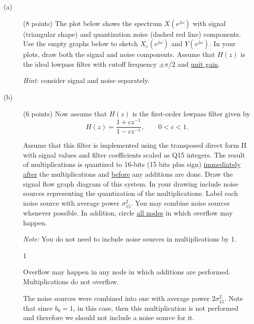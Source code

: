 \documentclass[10pt]{article}
\def\SOLUTIONS{1} %
\def\SolutionsColor{red2}
\begin{document}
\begin{description}
\item[(a)] (8 points) The plot below shows the spectrum $X(e^{j\omega})$ with signal (triangular shape) and quantization noise (dashed red line) components. Use the empty graphs below to sketch $X_e(e^{j\omega})$ and $Y(e^{j\omega})$. In your plots, draw both the signal and noise components. Assume that $H(z)$ is the ideal lowpass filter with cutoff frequency $\pm\pi/2$ and \underline{unit gain}.

\textit{Hint:} consider signal and noise separately.
 
\FloatBarrier
\begin{figure}[!h]
\centering
	\resizebox{0.9\textwidth}{!}{} \label{fig:spectrum_upsample}
\end{figure}
\FloatBarrier

\item[(b)] (6 points) Now assume that $H(z)$ is the first-order lowpass filter given by
\begin{equation}
H(z) = \frac{1 + cz^{-1}}{1 - cz^{-1}}, \qquad 0 < c < 1.
\end{equation}

Assume that this filter is implemented using the transposed direct form II with signal values and filter coefficients scaled as Q15 integers. The result of multiplications is quantized to 16-bits (15 bits plus sign) \underline{immediately after} the multiplications and \underline{before} any additions are done. Draw the signal flow graph diagram of this system. In your drawing include noise sources representing the quantization of the multiplications. Label each noise source with average power $\sigma_{15}^2$. You may combine noise sources whenever possible. In addition, circle \underline{all nodes} in which overflow may happen.

\textit{Note:} You do not need to include noise sources in multiplications by 1.

\if\SOLUTIONS1
{\color{\SolutionsColor}
Overflow may happen in any node in which additions are performed. Multiplications do not overflow. 

The noise sources were combined into one with average power $2\sigma_{15}^2$. Note that since $b_0 = 1$, in this case, then this multiplication is not performed and therefore we should not include a noise source for it.

\FloatBarrier
\begin{figure}[h!]
\centering
	\def\SolD{1}
	\resizebox{0.5\textwidth}{!}{}
\end{figure}
\FloatBarrier
}
\else\vspace{7cm}
\fi


\end{description}
\end{document}

